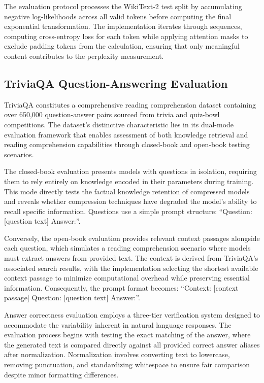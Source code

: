 The evaluation protocol processes the WikiText-2 test split by accumulating negative log-likelihoods across all valid tokens before computing the final exponential transformation. The implementation iterates through sequences, computing cross-entropy loss for each token while applying attention masks to exclude padding tokens from the calculation, ensuring that only meaningful content contributes to the perplexity measurement.

\subsection{TriviaQA Question-Answering Evaluation}

TriviaQA \cite{triviaqa} constitutes a comprehensive reading comprehension dataset containing over 650,000 question-answer pairs sourced from trivia and quiz-bowl competitions. The dataset's distinctive characteristic lies in its dual-mode evaluation framework that enables assessment of both knowledge retrieval and reading comprehension capabilities through closed-book and open-book testing scenarios.

The closed-book evaluation presents models with questions in isolation, requiring them to rely entirely on knowledge encoded in their parameters during training. This mode directly tests the factual knowledge retention of compressed models and reveals whether compression techniques have degraded the model's ability to recall specific information. Questions use a simple prompt structure: ``Question: [question text] Answer:''.

Conversely, the open-book evaluation provides relevant context passages alongside each question, which simulates a reading comprehension scenario where models must extract answers from provided text. The context is derived from TriviaQA's associated search results, with the implementation selecting the shortest available context passage to minimize computational overhead while preserving essential information. Consequently, the prompt format becomes: ``Context: [context passage] Question: [question text] Answer:''.

Answer correctness evaluation employs a three-tier verification system designed to accommodate the variability inherent in natural language responses. The evaluation process begins with testing the exact matching of the answer, where the generated text is compared directly against all provided correct answer aliases after normalization. Normalization involves converting text to lowercase, removing punctuation, and standardizing whitespace to ensure fair comparison despite minor formatting differences.

